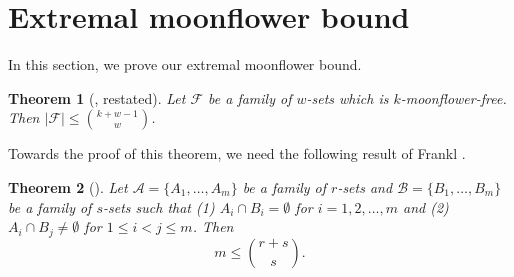 \documentclass{article}
\newtheorem{theorem}{Theorem}[section]
\newtheorem{lemma}[lemma]{Lemma}
\renewcommand{\epsilon}{\varepsilon}
\renewcommand{\Pr}{\mathop{\bf Pr\/}}
\newcommand{\<}{\langle}
\renewcommand{\>}{\rangle}
\newcommand{\calA}{\mathcal{A}}
\newcommand{\calB}{\mathcal{B}}
\newcommand{\calF}{\mathcal{F}}
\newcommand{\ignore}[1]{{}}
\begin{document}
\ignore{
Lastly, we need the following lemma which shows random sampling preserves the weight of a codeword with high probability.

\begin{lemma}\label{lem:chernoff_random_samp_weight}
    Let $S \cup T$ be a partition of $[n]$. For $p \in (0, 1]$, let $S_p$ be a random subset of $S$ where each element of $S$ is included independently with probability $p$. For any codeword $c \in \{0, 1\}^n$ and any $\epsilon \in (0,1 )$, we have that
    \[
    \Pr_{S_p} \left[\frac{1}{p}\text{Ham}(c|_{S_p}) + \text{Ham}(c|_T) \notin [1-\epsilon, 1+\epsilon] \cdot \text{Ham}(c) \right] < 2 \exp (-\epsilon^2 \text{Ham}(c) p / 3).
    \]
\end{lemma}
\begin{proof}
    Let $w_S = \text{Ham}(c|_S)$ and $w_T= \text{Ham}(c|_T)$, so $\text{Ham}(c) = w_S + w_T$. Notice $\text{Ham}(w_{S_p})$ is the summation of $n$ independent Bernoulli random variables. Applying Lemma \ref{lem:chernoff_standard} with $n: = w_S$ and $\delta := \epsilon \cdot \frac{w_S + w_T}{w_S}$, we have
    \[
    \Pr_{S_p} \left[\text{Ham}(c|_{S_p}) \notin [1-\delta, 1+\delta] \cdot pn \right] < 2\exp (-\epsilon^2 \text{Ham}(c) p / 3).
    \]
    Lastly, notice
    \[
    \begin{split}
        \text{Ham}(c_{S_p}) \notin [1-\delta, 1+\delta]pn &\Leftrightarrow \frac{1}{p} \text{Ham}(c|_{S_p}) + \text{Ham}(c|_T) \notin [1-\delta, 1+\delta] \cdot w_S + w_T \\
        &\Leftrightarrow  \frac{1}{p} \text{Ham}(c|_{S_p}) + \text{Ham}(c|_T) \notin [1-\epsilon, 1+\epsilon] \cdot \text{Ham}(c),
    \end{split}
    \]
    as desired.
\end{proof}}


\section{Extremal moonflower bound}\label{sec:moonflower}
In this section, we prove our extremal moonflower bound. 
\begin{theorem}[, restated]\label{thm:moonflower_bnd}
    Let $\calF$ be a family of $w$-sets which is $k$-moonflower-free. Then $|\calF| \leq \binom{k+w-1}{w}$.
\end{theorem}

Towards the proof of this theorem, we need the following result of Frankl \cite{Frankl1982ExtremalProblem}.
\begin{theorem}[\cite{Frankl1982ExtremalProblem}]\label{thm:frankl}
    Let $\calA = \{A_1,\ldots,A_m\}$ be a family of $r$-sets and $\calB = \{B_1,\ldots,B_m\}$ be a family of $s$-sets such that (1) $A_i \cap B_i = \emptyset$ for $i = 1,2,\ldots,m$ and (2)  $A_i \cap B_j \neq \emptyset$ for $1 \leq i < j \leq m$. Then 
    \[
    m \leq \binom{r+s}{s}.
    \]
\end{theorem}
\end{document}
